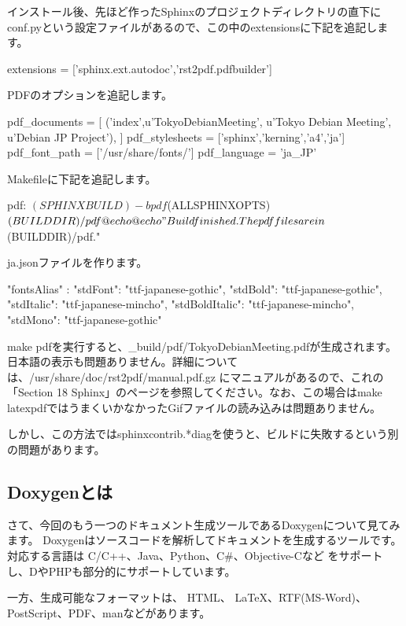 \documentclass[mingoth,a4paper]{jsarticle}
\begin{document}
インストール後、先ほど作ったSphinxのプロジェクトディレクトリの直下にconf.pyという設定ファイルがあるので、この中のextensionsに下記を追記します。
\begin{commandline}
extensions = ['sphinx.ext.autodoc','rst2pdf.pdfbuilder']
\end{commandline}

PDFのオプションを追記します。
\begin{commandline}
pdf_documents = [
        ('index',u'TokyoDebianMeeting', u'Tokyo Debian Meeting', u'Debian JP Project'),
]
pdf_stylesheets = ['sphinx','kerning','a4','ja']
pdf_font_path = ['/usr/share/fonts/']
pdf_language = 'ja_JP'
\end{commandline}

Makefileに下記を追記します。
\begin{commandline}
pdf:
        $(SPHINXBUILD) -b pdf $(ALLSPHINXOPTS) $(BUILDDIR)/pdf
        @echo
        @echo "Build finished. The pdf files are in $(BUILDDIR)/pdf."
\end{commandline}

ja.jsonファイルを作ります。
\begin{commandline}
{
  "fontsAlias" : {
    "stdFont": "ttf-japanese-gothic",
    "stdBold": "ttf-japanese-gothic",
    "stdItalic": "ttf-japanese-mincho",
    "stdBoldItalic": "ttf-japanese-mincho",
    "stdMono": "ttf-japanese-gothic"
  }
}
\end{commandline}

make pdfを実行すると、\_build/pdf/TokyoDebianMeeting.pdfが生成されます。日本語の表示も問題ありません。詳細については、/usr/share/doc/rst2pdf/manual.pdf.gz にマニュアルがあるので、これの「Section 18 Sphinx」のページを参照してください。なお、この場合はmake latexpdfではうまくいかなかったGifファイルの読み込みは問題ありません。

しかし、この方法ではsphinxcontrib.*diagを使うと、ビルドに失敗するという別の問題があります。

\subsection{Doxygenとは}

さて、今回のもう一つのドキュメント生成ツールであるDoxygenについて見てみます。
Doxygenはソースコードを解析してドキュメントを生成するツールです。対応する言語は
C/C++、Java、Python、C\#、Objective-Cなど
をサポートし、DやPHPも部分的にサポートしています。

一方、生成可能なフォーマットは、
HTML、 \LaTeX 、RTF(MS-Word)、PostScript、PDF、manなどがあります。
\end{document}
